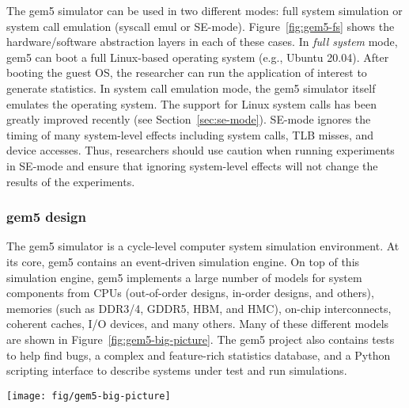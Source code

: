 The gem5 simulator can be used in two different modes: full system simulation or system call emulation (syscall emul or SE-mode).
Figure~\ref{fig:gem5-fs} shows the hardware/software abstraction layers in each of these cases.
In \emph{full system} mode, gem5 can boot a full Linux-based operating system (e.g., Ubuntu 20.04).
After booting the guest OS, the researcher can run the application of interest to generate statistics.
In system call emulation mode, the gem5 simulator itself emulates the operating system.
The support for Linux system calls has been greatly improved recently (see Section~\ref{sec:se-mode}).
SE-mode ignores the timing of many system-level effects including system calls, TLB misses, and device accesses.
Thus, researchers should use caution when running experiments in SE-mode and ensure that ignoring system-level effects will not change the results of the experiments.


\subsubsection{gem5 design}

The gem5 simulator is a cycle-level computer system simulation environment.
At its core, gem5 contains an event-driven simulation engine.
On top of this simulation engine, gem5 implements a large number of models for system components from CPUs (out-of-order designs, in-order designs, and others), memories (such as DDR3/4, GDDR5, HBM, and HMC), on-chip interconnects, coherent caches, I/O devices, and many others.
Many of these different models are shown in Figure~\ref{fig:gem5-big-picture}.
The gem5 project also contains tests to help find bugs, a complex and feature-rich statistics database, and a Python scripting interface to describe systems under test and run simulations.

\begin{figure*}
  \centering
  \texttt{[image: fig/gem5-big-picture]}
  \caption{An overview of gem5's architecture. Its modular components allow any of each model type to be used in system configuration via Python scripts. Users can choose the fidelity of the memory system, CPU model, etc. while being able to select any ISA, devices, etc. The port interface allows any memory component to be connected to any other memory component as specified by the Python script. Details of each of these simulator components are discussed in Section~\ref{sec:main-features}}
  \label{fig:gem5-big-picture}
\end{figure*}

